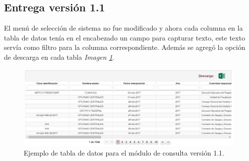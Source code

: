 \documentclass[../reportesINE.tex]{subfiles}
\begin{document}
\subsection{Entrega versión 1.1}
El menú de selección de sistema no fue modificado y ahora cada columna en la tabla de datos tenía en el encabezado un campo para capturar texto, este texto servía como filtro para la columna correspondiente. Además se agregó la opción de descarga en cada tabla \textit{Imagen \ref{fig:tablaV2}}.

\begin{figure}[h]
  \centering
  \includegraphics[width=\linewidth]{img/tablaV2.PNG}
  \caption{Ejemplo de tabla de datos para el módulo de consulta versión 1.1.}
  \label{fig:tablaV2}
\end{figure}
\end{document}
